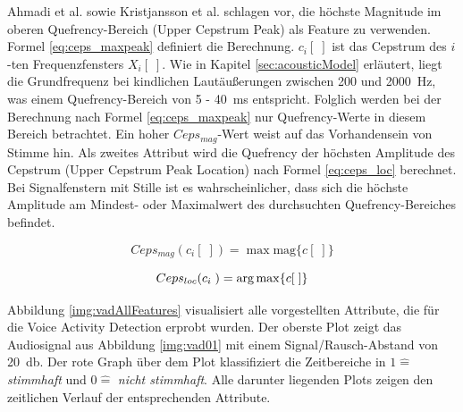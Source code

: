 Ahmadi et al. \cite{vad_ceps} sowie Kristjansson et al.\cite{vad_Lisboa} schlagen vor, die höchste Magnitude im oberen Quefrency-Bereich (Upper Cepstrum Peak) als Feature zu verwenden. Formel \ref{eq:ceps_maxpeak} definiert die Berechnung. $c_i[\;]$ ist das Cepstrum des $i$-ten Frequenzfensters $X_i[\;]$. Wie in Kapitel \ref{sec:acousticModel} erläutert, liegt die Grundfrequenz bei kindlichen Lautäußerungen zwischen 200 und \SI{2000}{\hertz}, was einem Quefrency-Bereich von 5 - \SI{40}{\milli\second} entspricht. Folglich werden bei der Berechnung nach Formel \ref{eq:ceps_maxpeak} nur Quefrency-Werte in diesem Bereich betrachtet. Ein hoher $Ceps_{mag}$-Wert weist auf das Vorhandensein von Stimme hin. Als zweites Attribut wird die Quefrency der höchsten Amplitude des Cepstrum (Upper Cepstrum Peak Location) nach Formel \ref{eq:ceps_loc} berechnet. Bei Signalfenstern mit Stille ist es wahrscheinlicher, dass sich die höchste Amplitude am Mindest- oder Maximalwert des durchsuchten Quefrency-Bereiches befindet.

\begin{equation}
Ceps_{mag}(c_i[\;]) = \max\text{mag}\{c[\;]\}
\label{eq:ceps_maxpeak}
\end{equation}

\begin{equation}
Ceps_{loc}(c_i\;) = \operatorname*{arg\,max} \{c[\;]\}
\label{eq:ceps_loc}
\end{equation}

Abbildung \ref{img:vadAllFeatures} visualisiert alle vorgestellten Attribute, die für die Voice Activity Detection erprobt wurden. Der oberste Plot zeigt das Audiosignal aus Abbildung \ref{img:vad01} mit einem Signal/Rausch-Abstand von \SI{20}{\decibel}. Der rote Graph über dem Plot klassifiziert die Zeitbereiche in $1 \hat{=} $ \emph{stimmhaft} und $0 \hat{=}$ \emph{nicht stimmhaft}. Alle darunter liegenden Plots zeigen den zeitlichen Verlauf der entsprechenden Attribute.

